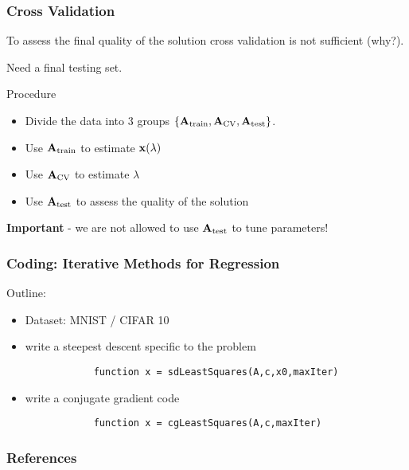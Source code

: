 \documentclass[12pt,fleqn]{beamer}
\begin{document}
\begin{frame}[fragile]
	\frametitle{Cross Validation}

To assess the final quality of the solution cross validation is not sufficient (why?).

\bigskip

Need a final testing set.

\bigskip

Procedure
\begin{itemize}
\item Divide the data into 3 groups $\{ {\bf A}_{\rm train}, {\bf A}_{\rm CV}, {\bf A}_{\rm test} \}$.
\item Use ${\bf A}_{\rm train}$ to estimate ${\bf x}(\lambda)$
\item Use ${\bf A}_{\rm CV}$ to estimate $\lambda$
\item Use ${\bf A}_{\rm test}$ to assess the quality of the solution
\end{itemize}

\pause

{\bf Important} -  we are not allowed to use ${\bf A}_{\rm test}$ to tune parameters!




\end{frame}




\begin{frame}[fragile]
	\frametitle{Coding: Iterative Methods for Regression}
	
	Outline:
	\begin{itemize}
		\item Dataset: MNIST / CIFAR 10
		\item write a steepest descent specific to the problem
		\begin{verbatim}
			function x = sdLeastSquares(A,c,x0,maxIter)
		\end{verbatim}
		\item write a conjugate gradient code
		\begin{verbatim}
			function x = cgLeastSquares(A,c,maxIter)
		\end{verbatim}
	\end{itemize}
\end{frame}



\begin{frame}[allowframebreaks]
	\frametitle{References}



\end{frame}
\end{document}
